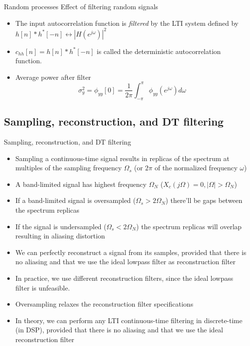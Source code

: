 \documentclass[10pt]{beamer}
\begin{document}
%
\begin{frame}{Random processes}
Effect of filtering random signals
\begin{center}
	\resizebox{0.7\linewidth}{!}{}
\end{center}

\begin{itemize}
	\item The input autocorrelation function is \textit{filtered} by the LTI system defined by $h[n]\ast h^*[-n] \leftrightarrow |H(e^{j\omega})|^2$
	\item $c_{hh}[n] = h[n]\ast h^*[-n]$ is called the deterministic autocorrelation function.
	\item Average power after filter
	\begin{equation*}
		\sigma^2_y = \phi_{yy}[0] = \frac{1}{2\pi}\int_{-\pi}^{\pi} \phi_{yy}(e^{j\omega}) d\omega
	\end{equation*}
\end{itemize}
\end{frame}


\subsection{Sampling, reconstruction, and DT filtering}
\begin{frame}{Sampling, reconstruction, and DT filtering}
\begin{itemize}
	\item Sampling a continuous-time signal results in replicas of the spectrum at multiples of the sampling frequency $\Omega_s$ (or $2\pi$ of the normalized frequency $\omega$)
	\item A band-limited signal has highest frequency $\Omega_N$ ($X_c(j\Omega) = 0, |\Omega| > \Omega_N$)
	\item If a band-limited signal is oversampled ($\Omega_s > 2\Omega_N$) there'll be gaps between the spectrum replicas
	\item If the signal is undersampled ($\Omega_s < 2\Omega_N$) the spectrum replicas will overlap resulting in aliasing distortion
	\item We can perfectly reconstruct a signal from its samples, provided that there is no aliasing and that we use the ideal lowpass filter as reconstruction filter
	\item In practice, we use different reconstruction filters, since the ideal lowpass filter is unfeasible.
	\item Oversampling relaxes the reconstruction filter specifications
	\item In theory, we can perform any LTI continuous-time filtering in discrete-time (in DSP), provided that there is no aliasing and that we use the ideal reconstruction filter
\end{itemize}
\end{frame}
\end{document}
